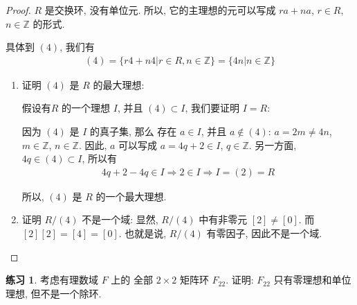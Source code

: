 \documentclass[utf8]{ctexbook}
\theoremstyle{definition}
\newtheorem{exercise}{练习}[section]
\begin{document}
\begin{proof}
$R$ 是交换环, 没有单位元. 所以, 它的主理想的元可以写成 $ra + na $, $r \in R$, $n \in \mathbb{Z}$ 的形式. 

具体到 $(4)$, 我们有
\begin{align*}
(4) = \{ r 4 + n 4 | r \in R, n \in \mathbb{Z} \} = \{ 4 n | n \in \mathbb{Z} \} 
\end{align*}
\begin{enumerate}
\item{证明 $(4)$ 是 $R$ 的最大理想:

假设有$R$ 的一个理想 $I$, 并且 $(4) \subset I$, 我们要证明 $I =R$:

因为 $(4)$ 是 $I$ 的真子集, 那么 存在 $a \in I$, 并且 $a \not \in (4)$: $a = 2m  \neq 4n $, $m \in \mathbb{Z}$, $n \in \mathbb{Z}$. 因此, $a$ 可以写成 $a = 4q + 2 \in I$, $q \in \mathbb{Z}$. 另一方面, $4q \in (4) \subset I $, 所以有
\begin{align*}
4q+2 - 4q \in I \Longrightarrow 2 \in I \Longrightarrow I = (2) = R
\end{align*}

所以, $(4)$ 是 $R$ 的一个最大理想.}
\item{证明 $R/(4)$ 不是一个域: 显然, $R/(4)$ 中有非零元 $[2] \neq [0]$. 而 $[2][2] = [4] = [0]$. 也就是说, $R/(4)$ 有零因子, 因此不是一个域.
}
\end{enumerate}
\end{proof}


\begin{exercise}
考虑有理数域 $F$ 上的 全部 $2 \times 2$ 矩阵环 $F_{22}$. 证明: $F_{22}$ 只有零理想和单位理想, 但不是一个除环.
\end{exercise}
\end{document}
